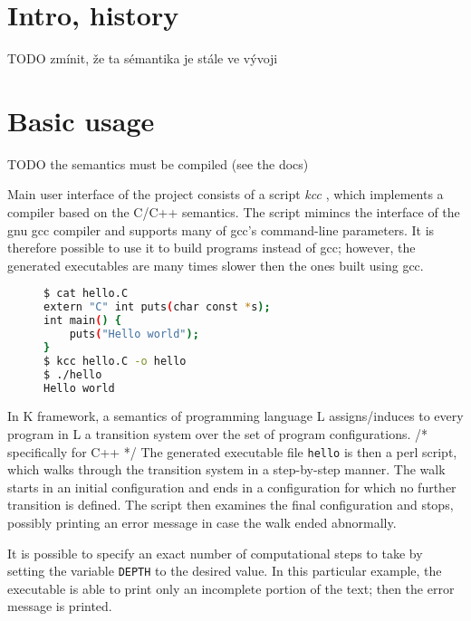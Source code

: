 \documentclass{fithesis3}
\newcommand{\kcc}{\textit{kcc} }
\begin{document}



\section{Intro, history}
TODO zmínit, že ta sémantika je stále ve vývoji

\section{Basic usage}

TODO the semantics must be compiled (see the docs)

Main user interface of the project consists of a script \kcc, which implements a compiler based on the C/C++ semantics. The script mimincs the interface of the gnu gcc compiler and supports many of gcc's command-line parameters. It is therefore possible to use it to build programs instead of gcc; however, the generated executables are many times slower then the ones built using gcc.

\begin{figure}[h]
\begin{lstlisting}[language=bash, basicstyle=\footnotesize\ttfamily]
$ cat hello.C
extern "C" int puts(char const *s);
int main() {
	puts("Hello world");
}
$ kcc hello.C -o hello
$ ./hello
Hello world
\end{lstlisting}
\end{figure}

In K framework, a semantics of programming language L assigns/induces to every program in L a transition system over the set of program configurations. /* specifically for C++ */ The generated executable file \texttt{hello} is then a perl script, which walks through the transition system in a step-by-step manner. The walk starts in an initial configuration and ends in a configuration for which no further transition is defined. The script then examines the final configuration and stops, possibly printing an error message in case the walk ended abnormally.

It is possible to specify an exact number of computational steps to take by setting the variable \texttt{DEPTH} to the desired value. In this particular example, the executable is able to print only an incomplete portion of the text; then the error message is printed. 
\end{document}
